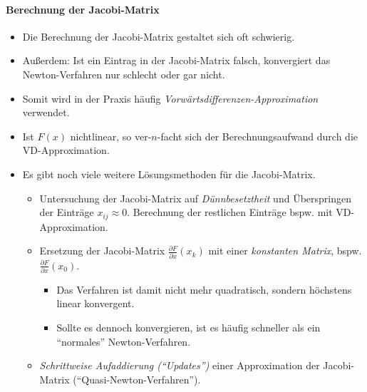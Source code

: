 \documentclass[a4paper, 11pt, accentcolor = tud3b]{tudreport}
\begin{document}
                    \paragraph{Berechnung der Jacobi-Matrix} %
                        \begin{itemize}
                        	\item Die Berechnung der Jacobi-Matrix gestaltet sich oft schwierig.
                        	\item Außerdem: Ist ein Eintrag in der Jacobi-Matrix falsch, konvergiert das Newton-Verfahren nur schlecht oder gar nicht.
                        	\item Somit wird in der Praxis häufig \textit{Vorwärtsdifferenzen-Approximation} verwendet.
                        	\item Ist \( F(x) \) nichtlinear, so ver-\(n\)-facht sich der Berechnungsaufwand durch die VD-Approximation.
                        	\item Es gibt noch viele weitere Lösungsmethoden für die Jacobi-Matrix.
	                        	\begin{itemize}
	                        		\item Untersuchung der Jacobi-Matrix auf \textit{Dünnbesetztheit} und Überspringen der Einträge \( x _ {ij} \approx 0 \). Berechnung der restlichen Einträge bspw. mit VD-Approximation.
	                        		\item Ersetzung der Jacobi-Matrix \( \frac{\partial F}{\partial x} (x _ k) \) mit einer \textit{konstanten Matrix}, bspw. \( \frac{\partial F}{\partial x} (x _ 0) \).
		                        		\begin{itemize}
		                        			\item Das Verfahren ist damit nicht mehr quadratisch, sondern höchstens linear konvergent.
		                        			\item Sollte es dennoch konvergieren, ist es häufig schneller als ein \enquote{normales} Newton-Verfahren.
		                        		\end{itemize}
	                        		\item \textit{Schrittweise Aufaddierung (\enquote{Updates})} einer Approximation der Jacobi-Matrix (\enquote{Quasi-Newton-Verfahren}).
	                        	\end{itemize}
                        \end{itemize}
\end{document}
